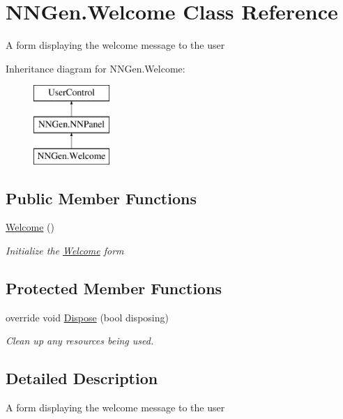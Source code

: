 \hypertarget{class_n_n_gen_1_1_welcome}{}\section{N\+N\+Gen.\+Welcome Class Reference}
\label{class_n_n_gen_1_1_welcome}


A form displaying the welcome message to the user  


Inheritance diagram for N\+N\+Gen.\+Welcome\+:\begin{figure}[H]
\begin{center}
\leavevmode
\includegraphics[height=3.000000cm]{class_n_n_gen_1_1_welcome}
\end{center}
\end{figure}
\subsection*{Public Member Functions}
\begin{DoxyCompactItemize}
\item 
\hyperlink{class_n_n_gen_1_1_welcome_aa592b7c0651aada9893adecd6eee5aaf}{Welcome} ()
\begin{DoxyCompactList}\small\item\em Initialize the \hyperlink{class_n_n_gen_1_1_welcome}{Welcome} form \end{DoxyCompactList}\end{DoxyCompactItemize}
\subsection*{Protected Member Functions}
\begin{DoxyCompactItemize}
\item 
override void \hyperlink{class_n_n_gen_1_1_welcome_a28378f009269602807ae9250a2789c13}{Dispose} (bool disposing)
\begin{DoxyCompactList}\small\item\em Clean up any resources being used. \end{DoxyCompactList}\end{DoxyCompactItemize}


\subsection{Detailed Description}
A form displaying the welcome message to the user 



